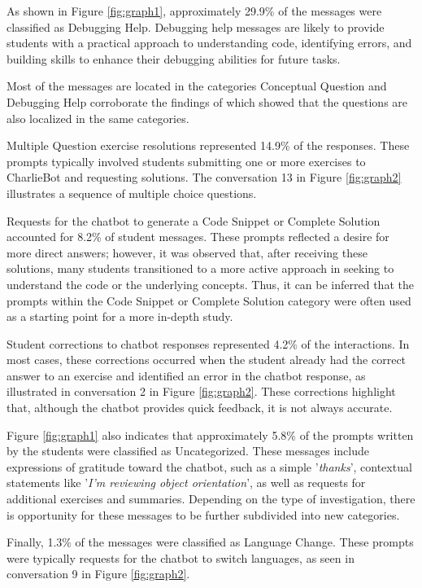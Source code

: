 \documentclass[a4paper,twoside]{article}
\begin{document}
As shown in Figure \ref{fig:graph1}, approximately 29.9\% of the messages were
classified as Debugging Help. Debugging help messages are likely to provide
students with a practical approach to understanding code, identifying errors,
and building skills to enhance their debugging abilities for future tasks.

Most of the messages are located in the categories Conceptual Question and
Debugging Help corroborate the findings of \cite{Ghimire24} which showed that
the questions are also localized in the same categories.

Multiple Question exercise resolutions represented 14.9\% of the responses.
These prompts typically involved students submitting one or more exercises to
CharlieBot and requesting solutions. The conversation 13 in Figure
\ref{fig:graph2} illustrates a sequence of multiple choice questions.

Requests for the chatbot to generate a Code Snippet or Complete Solution accounted
for 8.2\% of student messages. These prompts reflected a desire for more
direct answers; however, it was observed that, after receiving these solutions,
many students transitioned to a more active approach in seeking to understand
the code or the underlying concepts. Thus, it can be inferred that the prompts
within the Code Snippet or Complete Solution category were often used as a
starting point for a more in-depth study.

Student corrections to chatbot responses represented 4.2\% of the interactions.
In most cases, these corrections occurred when the student already had the
correct answer to an exercise and identified an error in the chatbot response,
as illustrated in conversation 2 in Figure \ref{fig:graph2}. These corrections
highlight that, although the chatbot provides quick feedback, it is not always
accurate.

Figure \ref{fig:graph1} also indicates that approximately 5.8\% of the prompts
written by the students were classified as Uncategorized. These messages include
expressions of gratitude toward the chatbot, such as a simple '\textit{thanks}',
contextual statements like '\textit{I'm reviewing object orientation}', as well
as requests for additional exercises and summaries. Depending on the type of
investigation, there is opportunity for these messages to be further subdivided
into new categories.

Finally, 1.3\% of the messages were classified as Language Change. These prompts
were typically requests for the chatbot to switch languages, as seen in
conversation 9 in Figure \ref{fig:graph2}.
\end{document}
